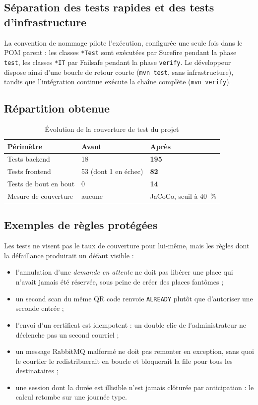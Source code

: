 \subsection{Séparation des tests rapides et des tests d'infrastructure}
La convention de nommage pilote l'exécution, configurée une seule fois dans le POM parent :
les classes \texttt{*Test} sont exécutées par Surefire pendant la phase \texttt{test}, les
classes \texttt{*IT} par Failsafe pendant la phase \texttt{verify}. Le développeur dispose
ainsi d'une boucle de retour courte (\texttt{mvn test}, sans infrastructure), tandis que
l'intégration continue exécute la chaîne complète (\texttt{mvn verify}).

\subsection{Répartition obtenue}
\begin{table}[H]\centering\renewcommand{\arraystretch}{1.25}
\begin{tabular}{|p{5cm}|p{2.6cm}|p{2.6cm}|}\hline
\rowcolor{gray!15}\textbf{Périmètre} & \textbf{Avant} & \textbf{Après} \\ \hline
Tests backend & 18 & \textbf{195} \\ \hline
Tests frontend & 53 (dont 1 en échec) & \textbf{82} \\ \hline
Tests de bout en bout & 0 & \textbf{14} \\ \hline
Mesure de couverture & aucune & JaCoCo, seuil à 40~\% \\ \hline
\end{tabular}
\caption{Évolution de la couverture de test du projet}\label{tab:devops-tests}
\end{table}

\subsection{Exemples de règles protégées}
Les tests ne visent pas le taux de couverture pour lui-même, mais les règles dont la
défaillance produirait un défaut visible :

\begin{itemize}
  \item l'annulation d'une \emph{demande en attente} ne doit pas libérer une place qui
        n'avait jamais été réservée, sous peine de créer des places fantômes ;
  \item un second scan du même QR code renvoie \texttt{ALREADY} plutôt que d'autoriser
        une seconde entrée ;
  \item l'envoi d'un certificat est idempotent : un double clic de l'administrateur ne
        déclenche pas un second courriel ;
  \item un message RabbitMQ malformé ne doit pas remonter en exception, sans quoi le
        courtier le redistribuerait en boucle et bloquerait la file pour tous les
        destinataires ;
  \item une session dont la durée est illisible n'est jamais clôturée par anticipation :
        le calcul retombe sur une journée type.
\end{itemize}

